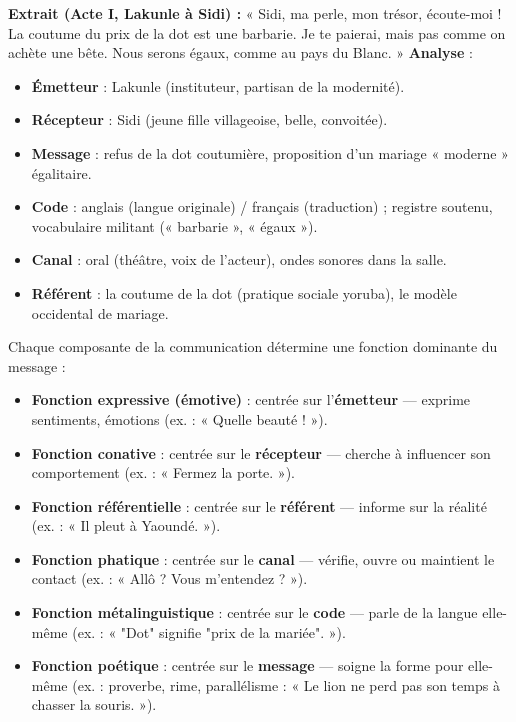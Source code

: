\documentclass[11pt]{article}
\newcounter{popsec}
\newcounter{popsub}
\newcommand{\courssub}[1]{%
  \stepcounter{popsub}%
  \par\vspace{9pt}\noindent{\popxbold\fontsize{11.5}{13}\selectfont\color{popink}{\color{poporange}\thepopsec.\thepopsub}\hspace{6pt}#1}\par\nopagebreak\vspace{4pt}
}
\begin{document}
\begin{exoresolu}
\textbf{Extrait (Acte I, Lakunle à Sidi) :} « Sidi, ma perle, mon trésor, écoute-moi ! La coutume du prix de la dot est une barbarie. Je te paierai, mais pas comme on achète une bête. Nous serons égaux, comme au pays du Blanc. »
\tcblower
\textbf{Analyse} :
\begin{itemize}
\item \textbf{Émetteur} : Lakunle (instituteur, partisan de la modernité).
\item \textbf{Récepteur} : Sidi (jeune fille villageoise, belle, convoitée).
\item \textbf{Message} : refus de la dot coutumière, proposition d'un mariage « moderne » égalitaire.
\item \textbf{Code} : anglais (langue originale) / français (traduction) ; registre soutenu, vocabulaire militant (« barbarie », « égaux »).
\item \textbf{Canal} : oral (théâtre, voix de l'acteur), ondes sonores dans la salle.
\item \textbf{Référent} : la coutume de la dot (pratique sociale yoruba), le modèle occidental de mariage.
\end{itemize}
\end{exoresolu}

\courssub{Les six fonctions du langage}

\begin{propriete}
Chaque composante de la communication détermine une fonction dominante du message :
\begin{itemize}
\item \textbf{Fonction expressive (émotive)} : centrée sur l'\textbf{émetteur} — exprime sentiments, émotions (ex. : « Quelle beauté ! »).
\item \textbf{Fonction conative} : centrée sur le \textbf{récepteur} — cherche à influencer son comportement (ex. : « Fermez la porte. »).
\item \textbf{Fonction référentielle} : centrée sur le \textbf{référent} — informe sur la réalité (ex. : « Il pleut à Yaoundé. »).
\item \textbf{Fonction phatique} : centrée sur le \textbf{canal} — vérifie, ouvre ou maintient le contact (ex. : « Allô ? Vous m'entendez ? »).
\item \textbf{Fonction métalinguistique} : centrée sur le \textbf{code} — parle de la langue elle-même (ex. : « "Dot" signifie "prix de la mariée". »).
\item \textbf{Fonction poétique} : centrée sur le \textbf{message} — soigne la forme pour elle-même (ex. : proverbe, rime, parallélisme : « Le lion ne perd pas son temps à chasser la souris. »).
\end{itemize}
\end{propriete}
\end{document}
